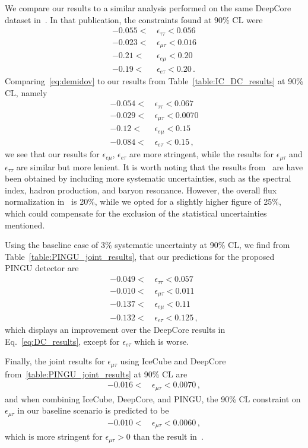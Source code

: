 \documentclass{revtex4-2}
\newcommand{\emt}{\ensuremath{\epsilon_{\mu\tau}}}
\newcommand{\eet}{\epsilon_{e\tau}}
\newcommand{\eem}{\epsilon_{e\mu}}
\newcommand{\ett}{\ensuremath{\epsilon_{\tau\tau}}}
\begin{document}
{{ We compare our results to a similar analysis performed on the same DeepCore dataset in~\cite{demidov}. In that publication, 
 the constraints found at 90\% CL were 
 \begin{align}\label{eq:demidov}
    -0.055 <&\, \ett < 0.056 \nonumber \\
    -0.023 <&\, \emt < 0.016 \nonumber \\
    -0.21 <&\, \eem < 0.20 \nonumber \\
    -0.19 <&\, \eet < 0.20\,.
 \end{align}
 Comparing~\ref{eq:demidov} to our results from Table~\ref{table:IC_DC_results} at 90\% CL, namely
 \begin{align}\label{eq:DC_results}
    -0.054 <&\, \ett < 0.067 \nonumber \\
    -0.029 <&\, \emt < 0.0070 \nonumber \\
    -0.12 <&\, \eem < 0.15 \nonumber \\
    -0.084 <&\, \eet < 0.15\,,
 \end{align}
 we see that our results for $\eem$, $\eet$ are more stringent, while the results for $\emt$ and $\ett$ are similar but more lenient. It is worth noting that the 
 results from~\cite{demidov} are have been obtained by including more systematic uncertainties, such as the spectral index, hadron production, and baryon resonance. 
 However, the overall flux normalization in~\cite{demidov} is 20\%, while we opted for a slightly higher figure of 25\%, which could compensate for the exclusion of the 
 statistical uncertainties mentioned.
 
 Using the baseline case of 3\% systematic uncertainty at 90\% CL, we find from Table~\ref{table:PINGU_joint_results}, that our predictions for the proposed PINGU detector are
 \begin{align}\label{eq:P_results}
    -0.049 <&\, \ett < 0.057 \nonumber \\
    -0.010 <&\, \emt < 0.011 \nonumber \\
    -0.137 <&\, \eem < 0.11 \nonumber \\
    -0.132 <&\, \eet < 0.125\,,
 \end{align}
 which displays an improvement over the DeepCore results in Eq.~\ref{eq:DC_results}, except for $\eet$ which is worse.
 
 Finally, the joint results for $\emt$ using IceCube and DeepCore from~\ref{table:PINGU_joint_results} at 90\% CL are
 \begin{align}\label{eq:ID_result}
    -0.016 <&\, \emt < 0.0070\,,
 \end{align}
 and when combining IceCube, DeepCore, and PINGU, the 90\% CL constraint on $\emt$ in our baseline scenario is predicted to be
 \begin{align}\label{eq:PID_result}
    -0.010 <&\, \emt < 0.0060\,,
 \end{align}
 which is more stringent for $\emt>0$ than the result in~\cite{deepcoreNSI}.
 
}}
\end{document}
